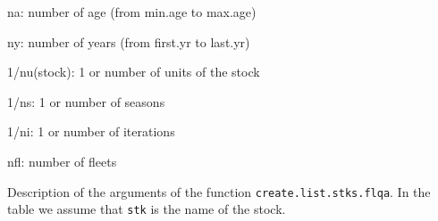 \begin{landscape}
\begin{table}[!ht]
\begin{footnotesize}
\begin{threeparttable}
      \begin{tablenotes}
        \item na: number of age (from min.age to max.age)
        \item ny: number of years (from first.yr to last.yr)
        \item 1/nu(stock): 1 or number of units of the stock
        \item 1/ns: 1 or number of seasons
        \item 1/ni:  1 or number of iterations
        \item nfl: number of fleets
      \end{tablenotes}
      
    \end{threeparttable}
  \end{footnotesize}

\end{table}



\begin{table}[!ht]

  \centering
  \begin{footnotesize}
    
    \caption{Description of the arguments of the function \texttt{create.list.stks.flqa}. 
      In the table we assume that \texttt{stk} is the name of the stock.}
    
    \label{tb:A4.table7}
    

\end{footnotesize}
\end{table}
\end{landscape}
